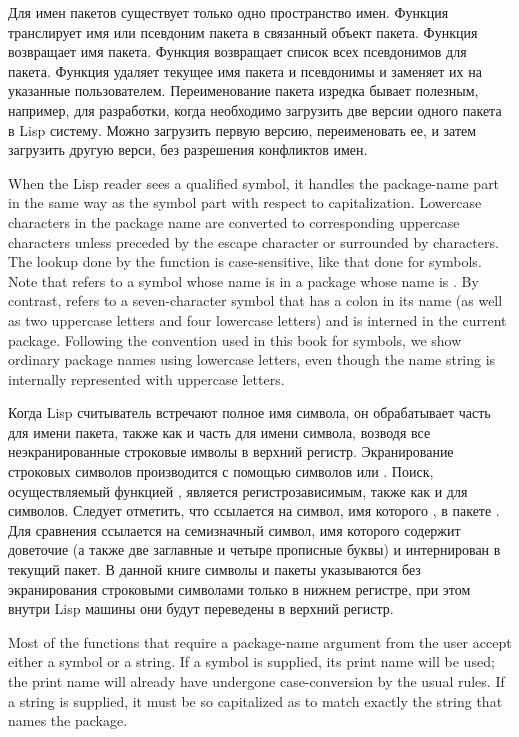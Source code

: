 Для имен пакетов существует только одно пространство имен. Функция
 транслирует имя или псевдоним пакета в связанный объект
пакета. Функция  возвращает имя пакета. Функция
 возвращает список всех псевдонимов для пакета. Функция
 удаляет текущее имя пакета и псевдонимы и заменяет их на
указанные пользователем. Переименование пакета изредка бывает полезным,
например, для разработки, когда необходимо загрузить две версии одного пакета в
Lisp систему. Можно загрузить первую версию, переименовать ее, и затем загрузить
другую верси, без разрешения конфликтов имен.

When the Lisp reader sees a qualified symbol, it handles the package-name
part in the same way as the symbol part with respect to capitalization.
Lowercase characters in the package name are converted to corresponding
uppercase characters
unless preceded by the escape character \cd{{\Xbackslash}} or
surrounded by \cd{|} characters.  The lookup done by the
 function is case-sensitive, like that done for
symbols.  Note that  refers to a symbol whose name is
 in a package whose name is .  By contrast,
 refers to a seven-character symbol that has a colon in its name
(as well as two uppercase letters and four lowercase letters)
and is interned in the current package.  Following the convention used
in this book for symbols, we show ordinary package names using
lowercase letters, even though the name string is internally represented
with uppercase letters.

Когда Lisp считыватель встречают полное имя символа, он обрабатывает часть для
имени пакета, также как и часть для имени символа, возводя все неэкранированные
строковые имволы в верхний регистр. Экранирование строковых символов
производится с помощью символов \cd{{\Xbackslash}} или \cd{|}. Поиск,
осуществляемый функцией , является регистрозависимым, также
как и для символов. Следует отметить, что  ссылается на символ,
имя которого , в пакете . Для сравнения  ссылается
на семизначный символ, имя которого содержит доветочие (а также две заглавные и
четыре прописные буквы) и интернирован в текущий пакет. В данной книге символы и
пакеты указываются без экранирования строковыми символами только в нижнем
регистре, при этом внутри Lisp машины они будут переведены в верхний регистр.

Most of the functions that require a package-name argument from the
user accept either a symbol or a string.  If a symbol is supplied,
its print name will be used; the print name will already have undergone
case-conversion by the usual rules.  If a string is supplied, it
must be so capitalized as to match exactly the
string that names the package.

